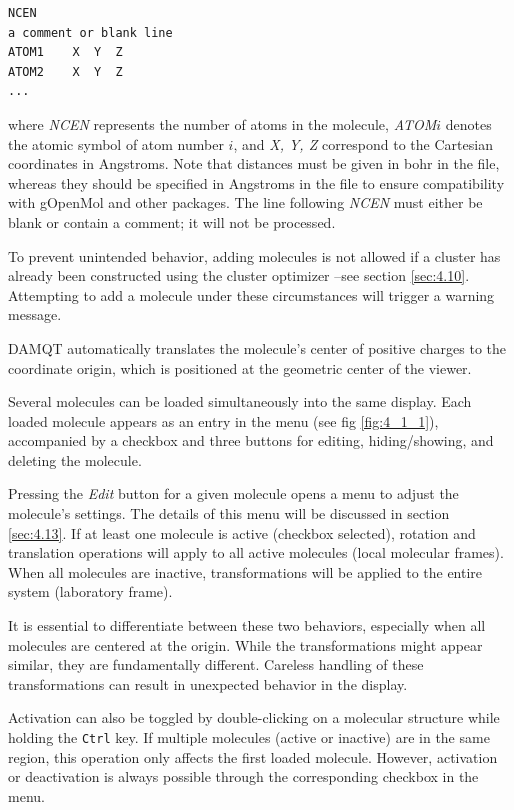 \documentclass[10pt]{article}
\begin{document}
\begin{verbatim}
NCEN
a comment or blank line
ATOM1    X  Y  Z
ATOM2    X  Y  Z
...
\end{verbatim}

where {\it NCEN} represents the number of atoms in the molecule, {\it ATOM}$i$ denotes  
the atomic symbol of atom number $i$, and {\it X, Y, Z} correspond to the Cartesian coordinates in Angstroms.  
Note that distances must be given in bohr in the \ggbs{ } file, whereas they should be specified  
in Angstroms in the \xyz{ } file to ensure compatibility with gOpenMol and other packages.  
The line following {\it NCEN} must either be blank or contain a comment; it will not be processed.  

To prevent unintended behavior, adding molecules is not allowed if a cluster has already been  
constructed using the cluster optimizer --see section \ref{sec:4.10}.  
Attempting to add a molecule under these circumstances will trigger a warning message.  

DAMQT automatically translates the molecule's center of positive charges to the coordinate origin,  
which is positioned at the geometric center of the viewer.  

\vspace*{5mm}{\bf Managing Multiple Molecules}\vspace*{5mm}  

Several molecules can be loaded simultaneously into the same display. Each loaded molecule appears  
as an entry in the menu (see fig \ref{fig:4_1_1}), accompanied by a checkbox and three buttons  
for editing, hiding/showing, and deleting the molecule.  

Pressing the {\it Edit} button for a given molecule opens a menu  
to adjust the molecule’s settings. The details of this menu will be discussed in section \ref{sec:4.13}.  
If at least one molecule is active (checkbox selected), rotation and translation operations  
will apply to all active molecules (local molecular frames).  
When all molecules are inactive, transformations will be applied to the entire system  
(laboratory frame).  

It is essential to differentiate between these two behaviors, especially when all molecules  
are centered at the origin. While the transformations might appear similar, they are fundamentally  
different. Careless handling of these transformations can result in unexpected behavior in the display.  

Activation can also be toggled by double-clicking  
on a molecular structure while holding the \texttt{Ctrl} key.  
If multiple molecules (active or inactive) are in the same region, this operation only affects  
the first loaded molecule. However, activation or deactivation is always possible  
through the corresponding checkbox in the menu.  
\end{document}
